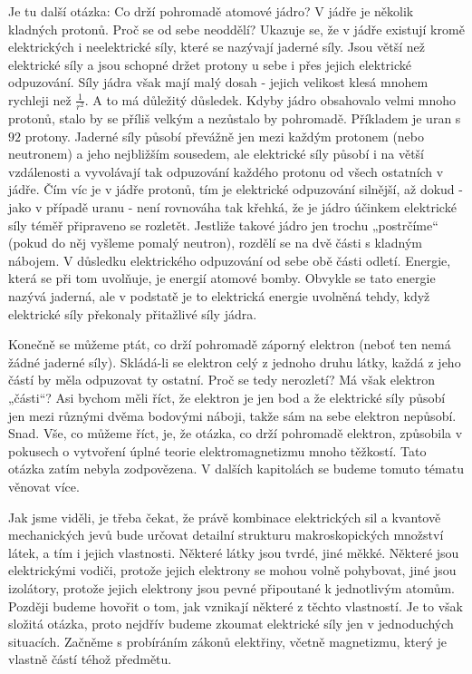     Je tu další otázka: Co drží pohromadě atomové jádro? V jádře je několik kladných protonů. Proč 
    se od sebe neoddělí? Ukazuje se, že v jádře existují kromě elektrických i neelektrické síly, 
    které se nazývají jaderné síly. Jsou větší než elektrické síly a jsou schopné držet protony u 
    sebe i přes jejich elektrické odpuzování. Síly jádra však mají malý dosah - jejich velikost 
    klesá mnohem rychleji než \(\frac{1}{r^2}\). A to má důležitý důsledek. Kdyby jádro obsahovalo 
    velmi mnoho protonů, stalo by se příliš velkým a nezůstalo by pohromadě. Příkladem je uran s 
    \(92\) protony. Jaderné síly působí převážně jen mezi každým protonem (nebo neutronem) a jeho 
    nejbližším sousedem, ale elektrické síly působí i na větší vzdálenosti a vyvolávají tak 
    odpuzování každého protonu od všech ostatních v jádře. Čím víc je v jádře protonů, tím je 
    elektrické odpuzování silnější, až dokud - jako v případě uranu - není rovnováha tak křehká, že 
    je jádro účinkem elektrické síly téměř připraveno se rozletět. Jestliže takové jádro jen trochu 
    „postrčíme“ (pokud do něj vyšleme pomalý neutron), rozdělí se na dvě části s kladným nábojem. V 
    důsledku elektrického odpuzování od sebe obě části odletí. Energie, která se při tom 
    uvolňuje, je energií atomové bomby. Obvykle se tato energie nazývá jaderná, ale v podstatě je to 
    elektrická energie uvolněná tehdy, když elektrické síly překonaly přitažlivé síly jádra.
    
    Konečně se můžeme ptát, co drží pohromadě záporný elektron (neboť ten nemá žádné jaderné síly). 
    Skládá-li se elektron celý z jednoho druhu látky, každá z jeho částí by měla odpuzovat ty 
    ostatní. Proč se tedy nerozletí? Má však elektron „části“? Asi bychom měli říct, že elektron je 
    jen bod a že elektrické síly působí jen mezi různými dvěma bodovými náboji, takže sám na sebe 
    elektron nepůsobí. Snad. Vše, co můžeme říct, je, že otázka, co drží pohromadě elektron, 
    způsobila v pokusech o vytvoření úplné teorie elektromagnetizmu mnoho těžkostí. Tato otázka 
    zatím nebyla zodpovězena. V dalších kapitolách se budeme tomuto tématu věnovat více.
    
    Jak jsme viděli, je třeba čekat, že právě kombinace elektrických sil a kvantově mechanických 
    jevů bude určovat detailní strukturu makroskopických množství látek, a tím i jejich vlastnosti. 
    Některé látky jsou tvrdé, jiné měkké. Některé jsou elektrickými vodiči, protože jejich elektrony 
    se mohou volně pohybovat, jiné jsou izolátory, protože jejich elektrony jsou pevné připoutané k 
    jednotlivým atomům. Později budeme hovořit o tom, jak vznikají některé z těchto vlastností. Je 
    to však složitá otázka, proto nejdřív budeme zkoumat elektrické síly jen v jednoduchých 
    situacích. Začněme s probíráním zákonů elektřiny, včetně magnetizmu, který je vlastně částí 
    téhož předmětu.
    
